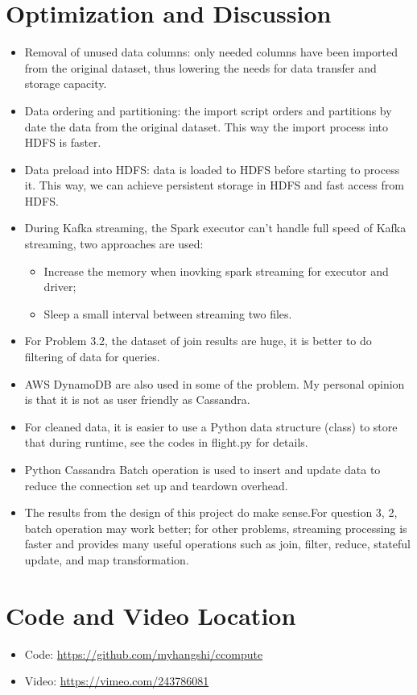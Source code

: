\documentclass[fontsize=11pt,paper=a4]{scrartcl}
\begin{document}
\section{Optimization and Discussion}
\begin{itemize}
\item Removal of unused data columns: only needed columns have been imported from the original dataset, thus lowering the needs for data transfer and storage capacity.
\item Data ordering and partitioning: the import script orders and partitions by date the data from the original dataset. This way the import process into HDFS is faster.
\item Data preload into HDFS: data  is loaded to HDFS before starting to process it. This way, we can achieve persistent storage in HDFS and fast access from HDFS.
\item During Kafka streaming, the Spark executor can't handle full speed of Kafka streaming, two approaches are used: 
\begin{itemize}
\item Increase the memory when inovking spark streaming for executor and driver; 
\item Sleep a small interval between streaming two files. 
\end{itemize} 
\item For Problem 3.2, the dataset of join results are huge, it is better to do filtering of data for queries. 
\item AWS DynamoDB are also used in some of the problem. My personal opinion is that it is not as user friendly as Cassandra. 
\item For cleaned data, it is easier to use a Python data structure (class) to store that during runtime, see the codes in flight.py for details. 
\item Python Cassandra Batch operation is used to insert and update data to reduce the connection set up and teardown overhead. 
\item The results from the design of this project do make sense.For question 3, 2, batch operation may work better; for other problems, streaming processing is faster and provides many useful operations such as join, filter, reduce, stateful update, and map transformation. 
\end{itemize} 
 
\section{Code and Video Location}
\begin{itemize}
\item Code:    \url{https://github.com/myhangshi/ccompute}
\item Video:   \url{https://vimeo.com/243786081}
\end{itemize} 
\end{document}
